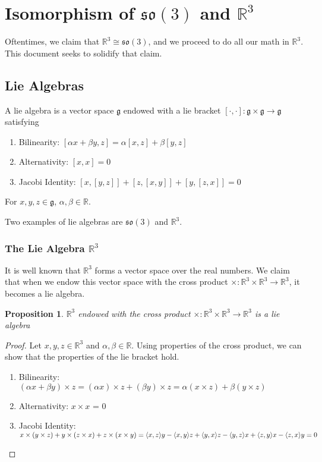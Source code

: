 \documentclass[a4paper]{article}
\newtheorem{prop}{Proposition}
\begin{document}
\section*{Isomorphism of $\mathfrak{so}(3)$ and $\mathds{R}^3$}
Oftentimes, we claim that $\mathds{R}^3 \cong \mathfrak{so}(3)$, and we proceed to do all our math in $\mathds{R}^3$. This document seeks to solidify that claim. 

\subsection*{Lie Algebras}
A lie algebra is a vector space $\mathfrak{g}$ endowed with a lie bracket $[\cdot, \cdot]: \mathfrak{g} \times \mathfrak{g} \rightarrow \mathfrak{g}$ satisfying
\begin{enumerate}
  \item Bilinearity: $[\alpha x + \beta y, z] = \alpha[x,z] + \beta[y,z]$
  \item Alternativity: $[x,x] = 0$
  \item Jacobi Identity: $[x,[y,z]] + [z,[x,y]] + [y,[z,x]] = 0$
\end{enumerate}
For $x,y,z \in \mathfrak{g}$, $\alpha, \beta \in \mathds{R}$.

Two examples of lie algebras are $\mathfrak{so}(3)$ and $\mathds{R}^3$.
\subsubsection*{The Lie Algebra $\mathds{R}^3$}

It is well known that $\mathds{R}^3$ forms a vector space over the real numbers. We claim that when we endow this vector space with the cross product $\times: \mathds{R}^3 \times \mathds{R}^3 \rightarrow \mathds{R}^3$, it becomes a lie algebra.

\begin{prop}
  $\mathds{R}^3$ endowed with the cross product $\times: \mathds{R}^3 \times \mathds{R}^3 \rightarrow \mathds{R}^3$ is a lie algebra 
\end{prop}

\begin{proof}
  Let $x,y,z \in \mathds{R}^3$ and $\alpha, \beta \in \mathds{R}$. Using properties of the cross product, we can show that the properties of the lie bracket hold.
  \begin{enumerate}
    \item Bilinearity: $(\alpha x + \beta y) \times z = (\alpha x) \times z + (\beta y) \times z = \alpha(x \times z) + \beta(y \times z)$ 
    \item Alternativity: $x \times x$ = 0
    \item Jacobi Identity: $x \times (y \times z) + y \times (z \times x)  + z \times (x \times y) =\\ \langle x, z\rangle y - \langle x, y\rangle z + \langle y, x\rangle z - \langle y, z\rangle x + \langle z, y\rangle x - \langle z, x\rangle y = 0$
  \end{enumerate}
\end{proof}
\end{document}
